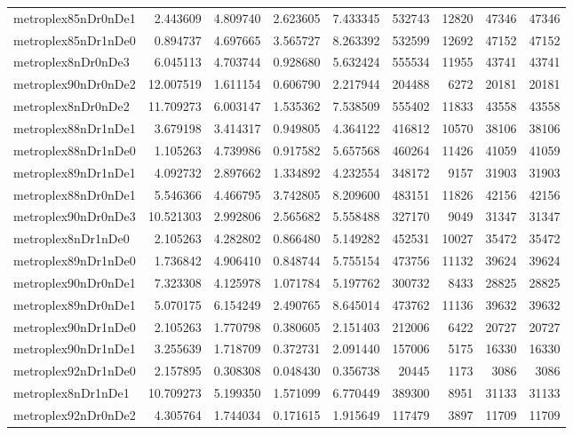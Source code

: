 \begin{longtable}{|l|r|r|r|r|r|r|r|r|}
metroplex85nDr0nDe1 & 2.443609 & 4.809740 & 2.623605 & 7.433345 & 532743 & 12820 & 47346 & 47346 \\
metroplex85nDr1nDe0 & 0.894737 & 4.697665 & 3.565727 & 8.263392 & 532599 & 12692 & 47152 & 47152 \\
metroplex8nDr0nDe3 & 6.045113 & 4.703744 & 0.928680 & 5.632424 & 555534 & 11955 & 43741 & 43741 \\
metroplex90nDr0nDe2 & 12.007519 & 1.611154 & 0.606790 & 2.217944 & 204488 & 6272 & 20181 & 20181 \\
metroplex8nDr0nDe2 & 11.709273 & 6.003147 & 1.535362 & 7.538509 & 555402 & 11833 & 43558 & 43558 \\
metroplex88nDr1nDe1 & 3.679198 & 3.414317 & 0.949805 & 4.364122 & 416812 & 10570 & 38106 & 38106 \\
metroplex88nDr1nDe0 & 1.105263 & 4.739986 & 0.917582 & 5.657568 & 460264 & 11426 & 41059 & 41059 \\
metroplex89nDr1nDe1 & 4.092732 & 2.897662 & 1.334892 & 4.232554 & 348172 & 9157 & 31903 & 31903 \\
metroplex88nDr0nDe1 & 5.546366 & 4.466795 & 3.742805 & 8.209600 & 483151 & 11826 & 42156 & 42156 \\
metroplex90nDr0nDe3 & 10.521303 & 2.992806 & 2.565682 & 5.558488 & 327170 & 9049 & 31347 & 31347 \\
metroplex8nDr1nDe0 & 2.105263 & 4.282802 & 0.866480 & 5.149282 & 452531 & 10027 & 35472 & 35472 \\
metroplex89nDr1nDe0 & 1.736842 & 4.906410 & 0.848744 & 5.755154 & 473756 & 11132 & 39624 & 39624 \\
metroplex90nDr0nDe1 & 7.323308 & 4.125978 & 1.071784 & 5.197762 & 300732 & 8433 & 28825 & 28825 \\
metroplex89nDr0nDe1 & 5.070175 & 6.154249 & 2.490765 & 8.645014 & 473762 & 11136 & 39632 & 39632 \\
metroplex90nDr1nDe0 & 2.105263 & 1.770798 & 0.380605 & 2.151403 & 212006 & 6422 & 20727 & 20727 \\
metroplex90nDr1nDe1 & 3.255639 & 1.718709 & 0.372731 & 2.091440 & 157006 & 5175 & 16330 & 16330 \\
metroplex92nDr1nDe0 & 2.157895 & 0.308308 & 0.048430 & 0.356738 & 20445 & 1173 & 3086 & 3086 \\
metroplex8nDr1nDe1 & 10.709273 & 5.199350 & 1.571099 & 6.770449 & 389300 & 8951 & 31133 & 31133 \\
metroplex92nDr0nDe2 & 4.305764 & 1.744034 & 0.171615 & 1.915649 & 117479 & 3897 & 11709 & 11709 \\

\end{longtable}
